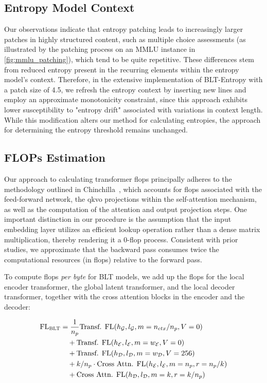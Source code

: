 \subsection{Entropy Model Context}
\label{section:entropy-context}
Our observations indicate that entropy patching leads to increasingly larger patches in highly structured content, such as multiple choice assessments (as illustrated by the patching process on an MMLU instance in \autoref{fig:mmlu_patching}), which tend to be quite repetitive. These differences stem from reduced entropy present in the recurring elements within the entropy model’s context. Therefore, in the extensive implementation of {\textsc BLT}-Entropy with a patch size of 4.5, we refresh the entropy context by inserting new lines and employ an approximate monotonicity constraint, since this approach exhibits lower susceptibility to "entropy drift" associated with variations in context length. While this modification alters our method for calculating entropies, the approach for determining the entropy threshold remains unchanged.

\subsection{FLOPs Estimation} 
\label{section:flops}

Our approach to calculating transformer flops principally adheres to the methodology outlined in Chinchilla~\citep{hoffmann2022training}, which accounts for flops associated with the feed-forward network, the qkvo projections within the self-attention mechanism, as well as the computation of the attention and output projection steps. One important distinction in our procedure is the assumption that the input embedding layer utilizes an efficient lookup operation rather than a dense matrix multiplication, thereby rendering it a 0-flop process. Consistent with prior studies, we approximate that the backward pass consumes twice the computational resources (in flops) relative to the forward pass.

To compute flops \textit{per byte} for {\textsc BLT} models, we add up the flops for the local encoder transformer, the global latent transformer, and the local decoder transformer, together with the cross attention blocks in the encoder and the decoder:

\begin{align}
    \text{FL}_{\text{{\textsc BLT}}} &= \frac{1}{n_p}\text{Transf. FL}(h_{\mathcal{G}}, l_{\mathcal{G}}, m=n_{ctx}/n_p,V=0) \\
    &\quad + \text{Transf. FL}(h_{\mathcal{E}}, l_{\mathcal{E}}, m=w_{\mathcal{E}}, V=0) \\
    &\quad + \text{Transf. FL}(h_{\mathcal{D}}, l_{\mathcal{D}}, m=w_{\mathcal{D}}, V=256) \\
    &\quad + k/n_p \cdot \text{Cross Attn. FL}(h_{\mathcal{E}}, l_{\mathcal{E}}, m=n_p, r=n_p/k) \\
    &\quad + \text{Cross Attn. FL}(h_{\mathcal{D}}, l_{\mathcal{D}}, m=k, r=k/n_p)
\end{align}

